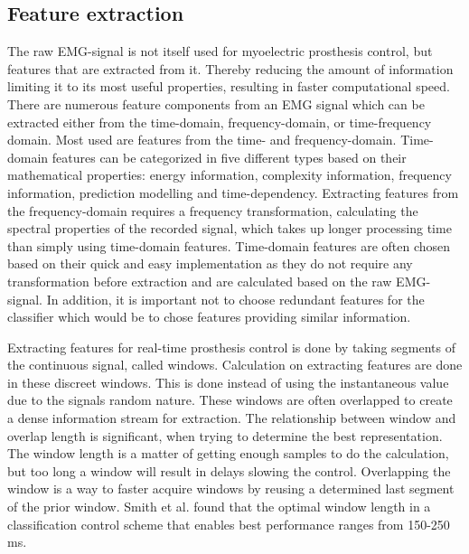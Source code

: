 \subsection{Feature extraction} \label{sub:BG:featureExtraction} %

The raw EMG-signal is not itself used for myoelectric prosthesis control, but features that are extracted from it. Thereby reducing the amount of information limiting it to its most useful properties, resulting in faster computational speed. \\
There are numerous feature components from an EMG signal which can be extracted either from the time-domain, frequency-domain, or time-frequency domain. Most used are features from the time- and frequency-domain. Time-domain features can be categorized in five different types based on their mathematical properties: energy information, complexity information, frequency information, prediction modelling and time-dependency. Extracting features from the frequency-domain requires a frequency transformation, calculating the spectral properties of the recorded signal, which takes up longer processing time than simply using time-domain features. 
Time-domain features are often chosen based on their quick and easy implementation as they do not require any transformation before extraction and are calculated based on the raw EMG-signal. In addition, it is important not to choose redundant features for the classifier which would be to chose features providing similar information. \cite{Phiny2012} 

Extracting features for real-time prosthesis control is done by taking segments of the continuous signal, called windows. Calculation on extracting features are done in these discreet windows. This is done instead of using the instantaneous value due to the signals random nature. These windows are often overlapped to create a dense information stream for extraction. The relationship between window and overlap length is significant, when trying to determine the best representation. The window length is a matter of getting enough samples to do the calculation, but too long a window will result in delays slowing the control. Overlapping the window is a way to faster acquire windows by reusing a determined last segment of the prior window. Smith et al. \cite{Smith2014} found that the optimal window length in a classification control scheme that enables best performance ranges from 150-250 ms. 
